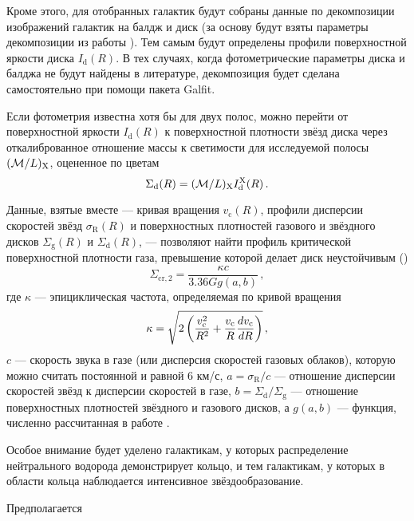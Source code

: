 \documentclass[russian,12pt]{article}
\begin{document}
Кроме этого, для отобранных галактик будут собраны данные по 
декомпозиции изображений галактик на балдж и диск (за основу будут взяты 
параметры декомпозиции из работы \cite{NvdH07}). Тем самым будут 
определены профили поверхностной яркости диска $I_\mathrm{d}(R)$. В тех 
случаях, когда фотометрические параметры диска и балджа не будут 
найдены в литературе, декомпозиция будет сделана самостоятельно при 
помощи пакета Galfit. %

Если фотометрия известна хотя бы для двух полос, можно 
перейти от поверхностной яркости $I_\mathrm{d}(R)$ 
к поверхностной плотности звёзд диска через откалиброванное отношение 
массы к светимости для исследуемой полосы $({\cal{M}}/L)_\mathrm{X}$, 
оцененное по цветам \citep{Bell+03}
$$
\Sigma_\mathrm{d}(R) = ({\cal{M}}/L)_\mathrm{X} 
I_\mathrm{d}^\mathrm{X}(R) \, .
$$

Данные, взятые вместе --- 
кривая вращения $v_\mathrm{c}(R)$, 
профили дисперсии скоростей звёзд $\sigma_\mathrm{R}(R)$
и поверхностных плотностей газового и звёздного дисков 
$\Sigma_\mathrm{g}(R)$ и $\Sigma_\mathrm{d}(R)$, --- 
позволяют найти профиль критической поверхностной плотности газа, 
превышение которой делает диск неустойчивым (\citealt{JS84,Efstathiou00})
\begin{equation}
\Sigma_\mathrm{cr,2} = \frac{\kappa c}{3.36 G g(a,b)} \, ,
\label{2fluid}
\end{equation}
где $\kappa$ --- эпициклическая частота, определяемая по кривой 
вращения
$$
\displaystyle \kappa = 
\sqrt{2 \left(\frac{v_{\rm c}^2}{R^2} + 
\frac{v_{\rm c}}{R} \frac{d v_{\rm c}}{dR} \right)} \, ,
$$
$c$ --- скорость звука в газе (или дисперсия скоростей газовых облаков), 
которую можно считать постоянной и равной 6 км/с, 
$a = \sigma_\mathrm{R}/c $ --- отношение дисперсии скоростей звёзд к 
дисперсии скоростей в газе, 
$b = \Sigma_\mathrm{d}/\Sigma_\mathrm{g}$ --- отношение поверхностных 
плотностей звёздного и газового дисков, 
а $g(a,b)$ --- функция, численно рассчитанная в работе \citet{Efstathiou00}.

Особое внимание будет уделено галактикам, у которых распределение 
нейтрального водорода демонстрирует кольцо, и тем галактикам, у которых 
в области кольца наблюдается интенсивное звёздообразование.

Предполагается
\end{document}

